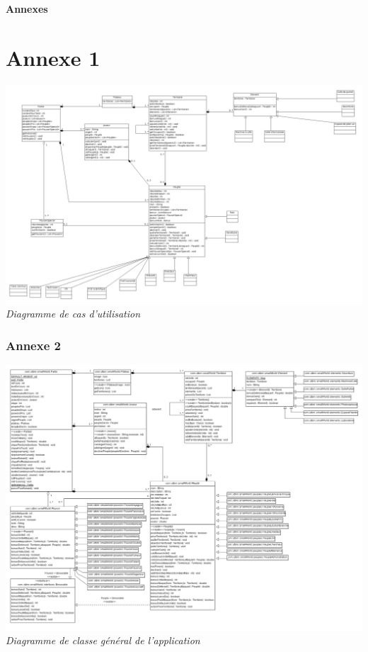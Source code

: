 \documentclass[a4paper, 11pt]{article}
\renewcommand{\appendixpage}{\huge \textbf{Annexes} \normalsize}
\begin{document}
	\begin{appendix} 
	\appendixpage
	\addappheadtotoc
	
	\vspace*{1cm}
		\chapter{\textbf{Annexe 1}}
		
		\begin{center}
			\vspace*{3cm}
			\includegraphics[width=16cm]{DiagrammeDeCasDUtilisation.png}\\
			\emph{Diagramme de cas d'utilisation}		
		\end{center}
		
		\newpage
		
		
		\subsection*{Annexe 2}
		
		\begin{center}
			\includegraphics[width=16cm]{DiagrammeDeClasseAvecSub.png}\\
			\emph{Diagramme de classe général de l'application}		
		\end{center}
		

\end{appendix}
\end{document}
